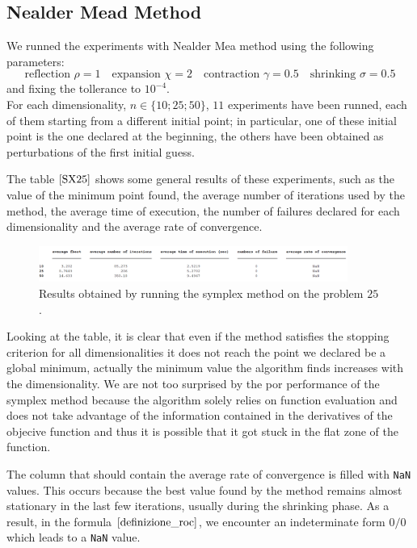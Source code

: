 \subsection*{Nealder Mead Method}
We runned the experiments with Nealder Mea method using the following parameters:
\begin{equation*}
    \text{reflection } \rho = 1 \quad
    \text{expansion } \chi = 2 \quad
    \text{contraction } \gamma = 0.5 \quad
    \text{shrinking } \sigma = 0.5
\end{equation*}
and fixing the tollerance to $10^{-4}$.
\\ For each dimensionality, $n \in \{10; 25; 50\}$, $11$ experiments have been runned, each of them starting from a different initial point; in particular, one of these initial point is the one declared at the beginning, the others have been obtained as perturbations of the first initial guess.

The table $\eqref{SX25}$ shows some general results of these experiments, such as the value of the minimum point found, the average number of iterations used by the method, the average time of execution, the number of failures declared for each dimensionality and the average rate of convergence.
\begin{figure}[htbp]
    \centering
    \includegraphics[width = 0.9\textwidth]{img/pb25_SX_table.png}
    \caption{Results obtained by running the symplex method on the problem $25$.}
    \label{SX25}
\end{figure}

Looking at the table, it is clear that even if the method satisfies the stopping criterion for all dimensionalities it does not reach the point we declared be a global minimum, actually the minimum value the algorithm finds increases with the dimensionality.
We are not too surprised by the por performance of the symplex method because the algorithm solely relies on function evaluation and does not take advantage of the information contained in the derivatives of the objecive function and thus it is possible that it got stuck in the flat zone of the function.

The column that should contain the average rate of convergence is filled with \verb+NaN+ values. This occurs because the best value found by the method remains almost stationary in the last few iterations, usually during the shrinking phase. As a result, in the formula $\eqref{definizione_roc}$, we encounter an indeterminate form $0/0$ which leads to a \verb+NaN+ value.


